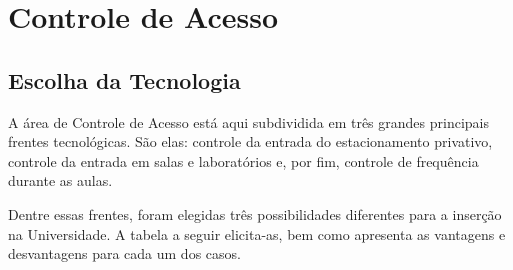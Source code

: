 \chapter[Controle de Acesso]{Controle de Acesso}
\section{Escolha da Tecnologia}
A área de Controle de Acesso está aqui subdividida em três grandes principais frentes tecnológicas.
São elas: controle da entrada do estacionamento privativo, controle da entrada em salas e laboratórios
e, por fim, controle de frequência durante as aulas.

Dentre essas frentes, foram elegidas três possibilidades diferentes para a inserção na Universidade.
A tabela a seguir elicita-as, bem como apresenta as vantagens e desvantagens para cada um dos casos.

